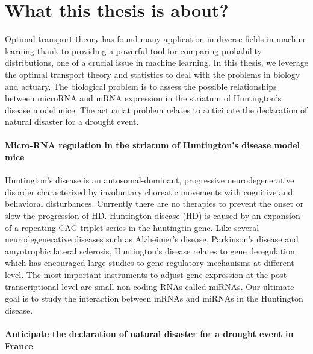 \section{What this thesis is about?}

Optimal transport theory has found many application in diverse fields in machine learning thank to 
providing a powerful tool for comparing probability distributions, one of a crucial issue
in machine learning.  In this thesis, we leverage the optimal transport theory and statistics to deal with 
the problems in biology and actuary. The biological problem is to assess the possible relationships between microRNA and mRNA expression in the striatum of Huntington's disease model mice. The actuariat problem relates to anticipate the declaration of natural disaster for a drought event. 

\paragraph{Micro-RNA regulation in the striatum of Huntington’s disease model mice}
Huntington's disease is an autosomal-dominant, progressive neurodegenerative disorder characterized by involuntary choreatic movements with cognitive and behavioral disturbances. Currently there are no therapies to prevent the onset or slow the progression of HD.  Huntington disease (HD) is  caused by an expansion of  a repeating CAG triplet series in the huntingtin gene. Like several neurodegenerative diseases such as Alzheimer's disease, Parkinson's disease and amyotrophic lateral sclerosis, Huntington's disease relates to gene deregulation which has encouraged large studies to gene regulatory mechanisms at different level. The most important instruments to adjust gene expression at the post-transcriptional level are small non-coding RNAs called miRNAs.  Our ultimate goal is to study the interaction between mRNAs and miRNAs in the Huntington disease. 

\paragraph{Anticipate the declaration of natural disaster for a drought event in France}




